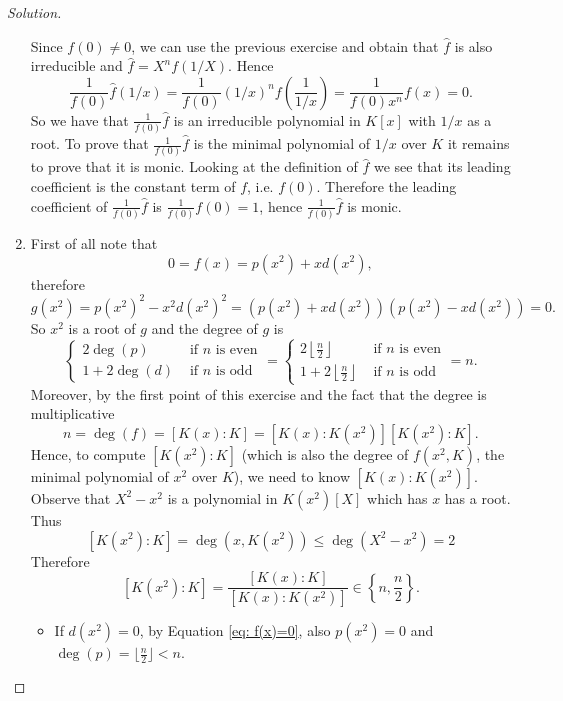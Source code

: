 \documentclass[a4paper,10pt,reqno]{amsart}
\newenvironment{sol}
  {\renewcommand\qedsymbol{$\blacksquare$}\begin{proof}[Solution]}
  {\end{proof}}
\begin{document}
\begin{sol}
\begin{enumerate}[label=(\roman*)]
    Since $f(0)\neq 0$, we can use the previous exercise and obtain that $\widehat{f}$ is also irreducible and $\widehat{f}=X^nf(1/X)$.
    Hence
    \[
    \frac{1}{f(0)}\widehat{f}\left(1/x\right)=\frac{1}{f(0)}\left(1/x\right)^nf\left(\frac{1}{1/x}\right)=\frac{1}{f(0)x^n}f(x)=0.
    \]
    So we have that $\frac{1}{f(0)}\widehat{f}$ is an irreducible polynomial in $K[x]$ 
    with $1/x$ as a root.
    To prove that $\frac{1}{f(0)}\widehat{f}$ is 
    the minimal polynomial of $1/x$ over $K$ it remains to prove that it is monic.
    Looking at the definition of $\widehat{f}$ we see that its leading coefficient
    is the constant term of $f$, i.e. $f(0)$.
    Therefore the leading coefficient of $\frac{1}{f(0)}\widehat{f}$ is $\frac{1}{f(0)}f(0)=1$, hence $\frac{1}{f(0)}\widehat{f}$ is monic.
    \item 
    First of all note that 
    \begin{equation}
           0=f(x)=p(x^2)+xd(x^2), \label{eq: f(x)=0}
    \end{equation} therefore
    \[
    g(x^2)=p(x^2)^2-x^2d(x^2)^2=(p(x^2)+xd(x^2))(p(x^2)-xd(x^2))=0.
    \]
    So $x^2$ is a root of $g$ and the degree of $g$ is 
    \[
   \begin{cases}
        2\deg(p) &\text{ if }n\text{ is even}\\
        1+2\deg(d)&\text{ if }n\text{ is odd}
    \end{cases} =\begin{cases}
        2\left\lfloor \frac{n}{2}\right\rfloor &\text{ if }n\text{ is even}\\
        1+2\left\lfloor \frac{n}{2}\right\rfloor&\text{ if }n\text{ is odd}
    \end{cases} = n.
    \]
    Moreover, by the first point of this exercise and the fact that the degree is multiplicative
    \[
    n=\deg(f)=[K(x):K]=[K(x):K(x^2)][K(x^2):K].
    \]
    Hence, to compute $[K(x^2):K]$ (which is also the degree of $f(x^2,K)$,
    the minimal polynomial of $x^2$ over $K$), we need to know $[K(x):K(x^2)]$.
    Observe that $X^2-x^2$ is a polynomial in $K(x^2)[X]$ which has $x$ has a root. Thus 
    \[
    [K(x^2):K]=\deg(x,K(x^2))\leq \deg(X^2-x^2)=2
    \]
    Therefore 
    \begin{equation}\label{eq: deg of x^2}
        [K(x^2):K]=\frac{[K(x):K]}{[K(x):K(x^2)]}\in\left\{n,\frac{n}{2}\right\}.
    \end{equation}
    \begin{itemize}
        \item If $d(x^2)=0$, by Equation \eqref{eq: f(x)=0}, also $p(x^2)=0$ and $\deg(p)=\lfloor \frac{n}{2}\rfloor< n$.

\end{itemize}
\end{enumerate}
\end{sol}
\end{document}
